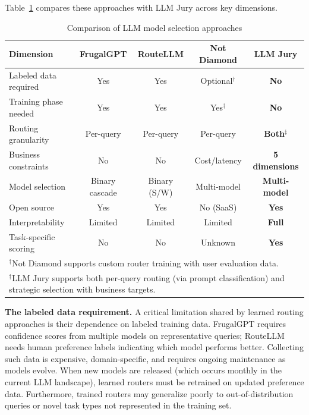 \documentclass[11pt,a4paper]{article}
\begin{document}
Table~\ref{tab:approach_comparison} compares these approaches with LLM Jury across key dimensions.

\begin{table}[h]
\centering
\caption{Comparison of LLM model selection approaches}
\label{tab:approach_comparison}
\small
\begin{tabular}{@{}lcccc@{}}
\toprule
\textbf{Dimension} & \textbf{FrugalGPT} & \textbf{RouteLLM} & \textbf{Not Diamond} & \textbf{LLM Jury} \\
\midrule
Labeled data required & Yes & Yes & Optional$^\dagger$ & \textbf{No} \\
Training phase needed & Yes & Yes & Yes$^\dagger$ & \textbf{No} \\
Routing granularity & Per-query & Per-query & Per-query & \textbf{Both}$^\ddagger$ \\
Business constraints & No & No & Cost/latency & \textbf{5 dimensions} \\
Model selection & Binary cascade & Binary (S/W) & Multi-model & \textbf{Multi-model} \\
Open source & Yes & Yes & No (SaaS) & \textbf{Yes} \\
Interpretability & Limited & Limited & Limited & \textbf{Full} \\
Task-specific scoring & No & No & Unknown & \textbf{Yes} \\
\bottomrule
\multicolumn{5}{l}{\footnotesize $^\dagger$Not Diamond supports custom router training with user evaluation data.}\\
\multicolumn{5}{l}{\footnotesize $^\ddagger$LLM Jury supports both per-query routing (via prompt classification) and strategic selection with business targets.}
\end{tabular}
\end{table}

\textbf{The labeled data requirement.} A critical limitation shared by learned routing approaches is their dependence on labeled training data. FrugalGPT requires confidence scores from multiple models on representative queries; RouteLLM needs human preference labels indicating which model performs better. Collecting such data is expensive, domain-specific, and requires ongoing maintenance as models evolve. When new models are released (which occurs monthly in the current LLM landscape), learned routers must be retrained on updated preference data. Furthermore, trained routers may generalize poorly to out-of-distribution queries or novel task types not represented in the training set.
\end{document}
